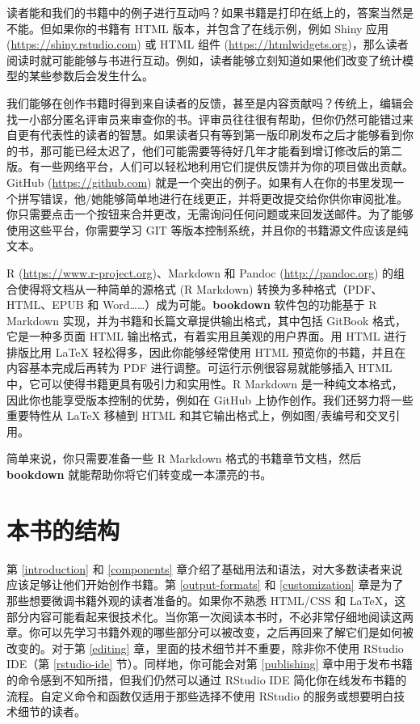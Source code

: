 \documentclass[
  12pt,
]{krantz}
\theoremstyle{definition}
\theoremstyle{definition}
\theoremstyle{definition}
\theoremstyle{definition}
\theoremstyle{remark}
\begin{document}
读者能和我们的书籍中的例子进行互动吗？如果书籍是打印在纸上的，答案当然是不能。但如果你的书籍有 HTML 版本，并包含了在线示例，例如 Shiny 应用 (\url{https://shiny.rstudio.com}) 或 HTML 组件 (\url{https://htmlwidgets.org})，那么读者阅读时就可能能够与书进行互动。例如，读者能够立刻知道如果他们改变了统计模型的某些参数后会发生什么。

我们能够在创作书籍时得到来自读者的反馈，甚至是内容贡献吗？传统上，编辑会找一小部分匿名评审员来审查你的书。评审员往往很有帮助，但你仍然可能错过来自更有代表性的读者的智慧。如果读者只有等到第一版印刷发布之后才能够看到你的书，那可能已经太迟了，他们可能需要等待好几年才能看到增订修改后的第二版。有一些网络平台，人们可以轻松地利用它们提供反馈并为你的项目做出贡献。GitHub (\url{https://github.com}) 就是一个突出的例子。如果有人在你的书里发现一个拼写错误，他/她能够简单地进行在线更正，并将更改提交给你供你审阅批准。你只需要点击一个按钮来合并更改，无需询问任何问题或来回发送邮件。为了能够使用这些平台，你需要学习 GIT 等版本控制系统，并且你的书籍源文件应该是纯文本。

R (\url{https://www.r-project.org})、Markdown 和 Pandoc (\url{http://pandoc.org}) 的组合使得将文档从一种简单的源格式 (R Markdown) 转换为多种格式（PDF、HTML、EPUB 和 Word\ldots\ldots）成为可能。\textbf{bookdown} 软件包的功能基于 R Markdown 实现，并为书籍和长篇文章提供输出格式，其中包括 GitBook 格式，它是一种多页面 HTML 输出格式，有着实用且美观的用户界面。用 HTML 进行排版比用 LaTeX 轻松得多，因此你能够经常使用 HTML 预览你的书籍，并且在内容基本完成后再转为 PDF 进行调整。可运行示例很容易就能够插入 HTML 中，它可以使得书籍更具有吸引力和实用性。R Markdown 是一种纯文本格式，因此你也能享受版本控制的优势，例如在 GitHub 上协作创作。我们还努力将一些重要特性从 LaTeX 移植到 HTML 和其它输出格式上，例如图/表编号和交叉引用。

简单来说，你只需要准备一些 R Markdown 格式的书籍章节文档，然后 \textbf{bookdown} 就能帮助你将它们转变成一本漂亮的书。

\hypertarget{ux672cux4e66ux7684ux7ed3ux6784}{%
\section*{本书的结构}\label{ux672cux4e66ux7684ux7ed3ux6784}}


第 \ref{introduction} 和 \ref{components} 章介绍了基础用法和语法，对大多数读者来说应该足够让他们开始创作书籍。第 \ref{output-formats} 和 \ref{customization} 章是为了那些想要微调书籍外观的读者准备的。如果你不熟悉 HTML/CSS 和 LaTeX，这部分内容可能看起来很技术化。当你第一次阅读本书时，不必非常仔细地阅读这两章。你可以先学习书籍外观的哪些部分可以被改变，之后再回来了解它们是如何被改变的。对于第 \ref{editing} 章，里面的技术细节并不重要，除非你不使用 RStudio IDE（第 \ref{rstudio-ide} 节）。同样地，你可能会对第 \ref{publishing} 章中用于发布书籍的命令感到不知所措，但我们仍然可以通过 RStudio IDE 简化你在线发布书籍的流程。自定义命令和函数仅适用于那些选择不使用 RStudio 的服务或想要明白技术细节的读者。
\end{document}
